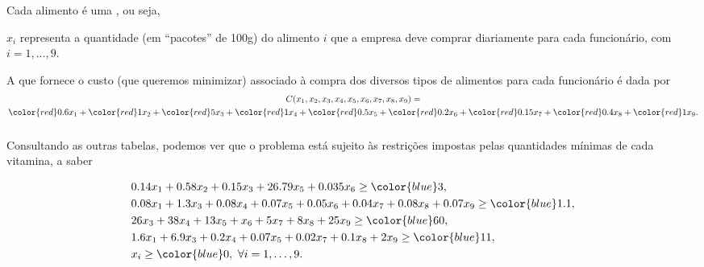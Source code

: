 \begin{frame}[label=introducao]
 Cada alimento é uma , ou seja, 
 
 
 \begin{center}
 $x_i$ representa a quantidade (em ``pacotes'' de 100g) do alimento $i$ que a empresa deve comprar diariamente para cada funcionário, com $i=1,\ldots,9$. 
 \end{center}\bigskip

A  que fornece o custo (que queremos minimizar) associado à compra  dos diversos tipos de alimentos para cada funcionário é dada por 
\begin{multline*}
C(x_1,x_2,x_3,x_4,x_5,x_6,x_7,x_8,x_9)= \\ {\color{red}0.6}x_1 + {\color{red} 1}x_2 +{\color{red} 5}x_3+{\color{red} 1}x_4+{\color{red} 0.5}x_5+{\color{red} 0.2}   x_6+{\color{red} 0.15}x_7+{\color{red} 0.4}x_8+{\color{red} 1}x_9.
\end{multline*}


\end{frame}



\begin{frame}[label=introducao]
\frametitle{ }

Consultando as outras tabelas, podemos ver que o problema está sujeito às restrições impostas pelas quantidades mínimas de cada vitamina, a saber

\begin{small}
\begin{align*}
&0.14x_1+0.58x_2+0.15x_3+26.79x_5+0.035x_6\geq {\color{blue} 3},\\
&0.08x_1+1.3x_3+0.08x_4+0.07x_5+0.05x_6+0.04x_7+0.08x_8+0.07x_9\geq {\color{blue} 1.1},\\
&26x_3+38x_4+13x_5+x_6+5x_7+8x_8+25x_9\geq {\color{blue} 60},\\
&1.6x_1+6.9x_3+0.2x_4+0.07x_5+0.02x_7+0.1x_8+2x_9\geq {\color{blue} 11},\\
&x_i\geq {\color{blue} 0}, \ \forall i=1,\ldots,9.
\end{align*} 
\end{small}


\end{frame}

